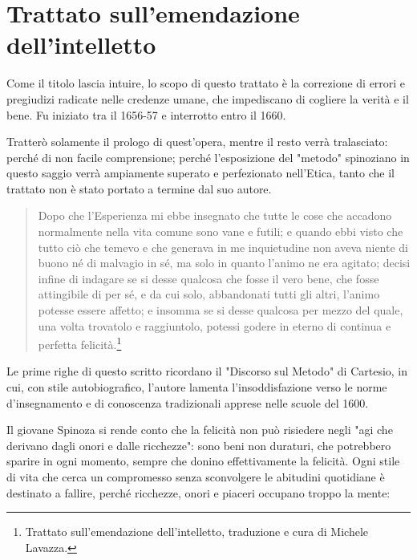 \chapter{Trattato sull'emendazione dell'intelletto}

\bigskip
\bigskip
\bigskip

Come il titolo lascia intuire, lo scopo di questo trattato è la correzione di errori e pregiudizi radicate nelle credenze umane, che impediscano di cogliere la verità e il bene. Fu iniziato tra il 1656-57 e interrotto entro il 1660.

Tratterò solamente il prologo di quest'opera, mentre il resto verrà tralasciato: perché di non facile comprensione; perché l'esposizione del "metodo" spinoziano in questo saggio verrà ampiamente superato  e perfezionato nell'Etica, tanto che il trattato non è stato portato a termine dal suo autore.

\begin{quotation}
	\small Dopo che l'Esperienza mi ebbe insegnato che tutte le cose che accadono normalmente nella vita
	comune sono vane e futili; e quando ebbi visto che tutto ciò che temevo e che generava in me
	inquietudine non aveva niente di buono né di malvagio in sé, ma solo in quanto l'animo ne era
	agitato; decisi infine di indagare se si desse qualcosa che fosse il vero bene, che fosse attingibile di
	per sé, e da cui solo, abbandonati tutti gli altri, l'animo potesse essere affetto; e insomma se si desse
	qualcosa per mezzo del quale, una volta trovatolo e raggiuntolo, potessi godere in eterno di continua
	e perfetta felicità.\footnote{Trattato sull'emendazione dell'intelletto, traduzione e cura di Michele Lavazza.}
\end{quotation}

Le prime righe di questo scritto ricordano il "Discorso sul Metodo" di Cartesio, in cui, con stile autobiografico, l'autore lamenta l'insoddisfazione verso le norme d'insegnamento e di conoscenza tradizionali apprese nelle scuole del 1600.

Il giovane Spinoza si rende conto che la felicità non può risiedere negli "agi che derivano dagli
onori e dalle ricchezze": sono beni non duraturi, che potrebbero sparire in ogni momento, sempre che donino effettivamente la felicità. Ogni stile di vita che cerca un compromesso senza sconvolgere le abitudini quotidiane è destinato a fallire, perché ricchezze, onori e piaceri occupano troppo la mente:

